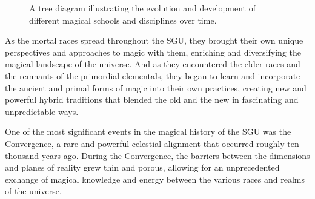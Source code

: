 \documentclass[12pt]{article}
\begin{document}
\begin{figure}[htb]
    \centering
    \caption{A tree diagram illustrating the evolution and development of different magical schools and disciplines over time.}
    \label{fig:magic_schools_tree}
\end{figure}

As the mortal races spread throughout the SGU, they brought their own unique perspectives and approaches to magic with them, enriching and diversifying the magical landscape of the universe. And as they encountered the elder races and the remnants of the primordial elementals, they began to learn and incorporate the ancient and primal forms of magic into their own practices, creating new and powerful hybrid traditions that blended the old and the new in fascinating and unpredictable ways.

One of the most significant events in the magical history of the SGU was the Convergence, a rare and powerful celestial alignment that occurred roughly ten thousand years ago. During the Convergence, the barriers between the dimensions and planes of reality grew thin and porous, allowing for an unprecedented exchange of magical knowledge and energy between the various races and realms of the universe.
\end{document}
